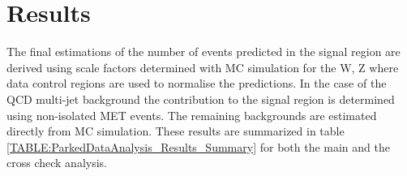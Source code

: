 \section{Results}


The final estimations of the number of events predicted in the signal region are derived using scale factors determined with \gls{MC} simulation for the W, Z where data control regions are used to normalise the predictions. In the case of the \gls{QCD} multi-jet background the contribution to the signal region is determined using non-isolated \gls{MET} events. The remaining backgrounds are estimated directly from \gls{MC} simulation. These results are summarized in table \ref{TABLE:ParkedDataAnalysis_Results_Summary} for both the main and the cross check analysis.




